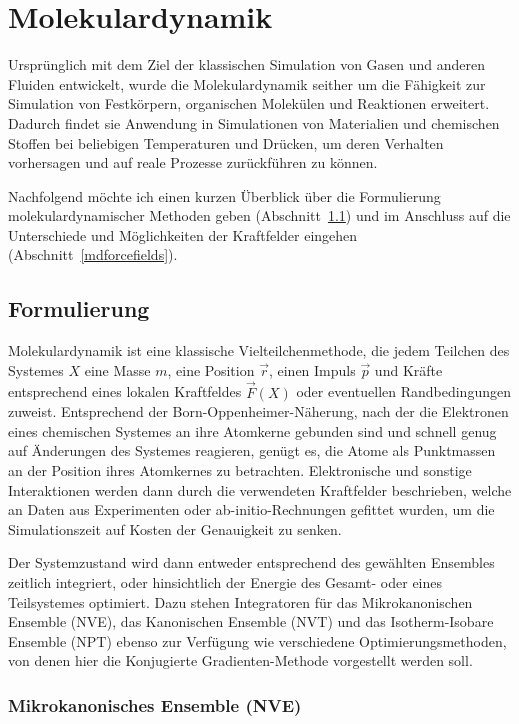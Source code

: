\section{Molekulardynamik}
\label{md}

Ursprünglich mit dem Ziel der klassischen Simulation von Gasen und anderen Fluiden entwickelt, wurde die Molekulardynamik seither um die Fähigkeit zur Simulation von Festkörpern, organischen Molekülen und Reaktionen erweitert.
Dadurch findet sie Anwendung in Simulationen von Materialien und chemischen Stoffen bei beliebigen Temperaturen und Drücken, um deren Verhalten vorhersagen und auf reale Prozesse zurückführen zu können.

Nachfolgend möchte ich einen kurzen Überblick über die Formulierung molekulardynamischer Methoden geben (Abschnitt~\ref{mdformulation}) und im Anschluss auf die Unterschiede und Möglichkeiten der Kraftfelder eingehen (Abschnitt~\ref{mdforcefields}).

\subsection{Formulierung}
\label{mdformulation}

Molekulardynamik ist eine klassische Vielteilchenmethode, die jedem Teilchen des Systemes $X$ eine Masse $m$, eine Position $\vec r$, einen Impuls $\vec p$ und Kräfte entsprechend eines lokalen Kraftfeldes $\vec{F}(X)$ oder eventuellen Randbedingungen zuweist.
Entsprechend der Born-Oppenheimer-Näherung, nach der die Elektronen eines chemischen Systemes an ihre Atomkerne gebunden sind und schnell genug auf Änderungen des Systemes reagieren, genügt es, die Atome als Punktmassen an der Position ihres Atomkernes zu betrachten.
Elektronische und sonstige Interaktionen werden dann durch die verwendeten Kraftfelder beschrieben, welche an Daten aus Experimenten oder ab-initio-Rechnungen gefittet wurden, um die Simulationszeit auf Kosten der Genauigkeit zu senken.

Der Systemzustand wird dann entweder entsprechend des gewählten Ensembles zeitlich integriert, oder hinsichtlich der Energie des Gesamt- oder eines Teilsystemes optimiert.
Dazu stehen Integratoren für das Mikrokanonischen Ensemble (NVE), das Kanonischen Ensemble (NVT) und das Isotherm-Isobare Ensemble (NPT) ebenso zur Verfügung wie verschiedene Optimierungsmethoden, von denen hier die Konjugierte Gradienten-Methode vorgestellt werden soll.

\subsubsection{Mikrokanonisches Ensemble (NVE)}

